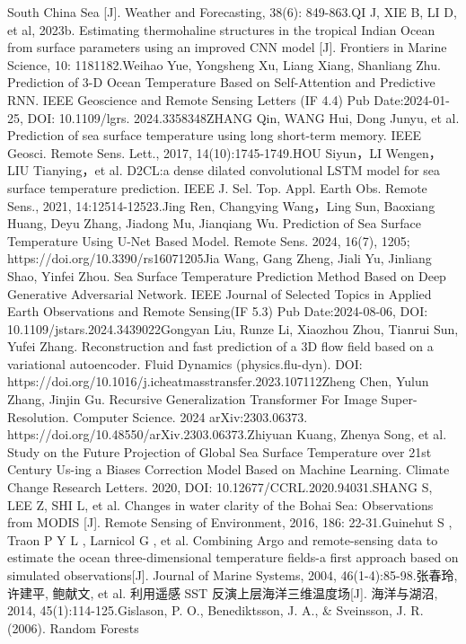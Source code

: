 \documentclass[
  12pt,
]{article}
\begin{document}
South China Sea {[}J{]}. Weather and Forecasting, 38(6): 849-863.QI J,
XIE B, LI D, et al, 2023b. Estimating thermohaline structures in the
tropical Indian Ocean from surface parameters using an improved CNN
model {[}J{]}. Frontiers in Marine Science, 10: 1181182.Weihao Yue,
Yongsheng Xu, Liang Xiang, Shanliang Zhu. Prediction of 3-D Ocean
Temperature Based on Self-Attention and Predictive RNN. IEEE Geoscience
and Remote Sensing Letters (IF 4.4) Pub Date:2024-01-25, DOI:
10.1109/lgrs. 2024.3358348ZHANG Qin, WANG Hui, Dong Junyu, et al.
Prediction of sea surface temperature using long short-term memory. IEEE
Geosci. Remote Sens. Lett., 2017, 14(10):1745-1749.HOU Siyun，LI
Wengen，LIU Tianying，et al. D2CL:a dense dilated convolutional LSTM
model for sea surface temperature prediction. IEEE J. Sel. Top. Appl.
Earth Obs. Remote Sens., 2021, 14:12514-12523.Jing Ren, Changying
Wang，Ling Sun, Baoxiang Huang, Deyu Zhang, Jiadong Mu, Jianqiang Wu.
Prediction of Sea Surface Temperature Using U-Net Based Model. Remote
Sens. 2024, 16(7), 1205; https://doi.org/10.3390/rs16071205Jia Wang,
Gang Zheng, Jiali Yu, Jinliang Shao, Yinfei Zhou. Sea Surface
Temperature Prediction Method Based on Deep Generative Adversarial
Network. IEEE Journal of Selected Topics in Applied Earth Observations
and Remote Sensing(IF 5.3) Pub Date:2024-08-06, DOI:
10.1109/jstars.2024.3439022Gongyan Liu, Runze Li, Xiaozhou Zhou, Tianrui
Sun, Yufei Zhang. Reconstruction and fast prediction of a 3D flow field
based on a variational autoencoder. Fluid Dynamics (physics.flu-dyn).
DOI: https://doi.org/10.1016/j.icheatmasstransfer.2023.107112Zheng Chen,
Yulun Zhang, Jinjin Gu. Recursive Generalization Transformer For Image
Super-Resolution. Computer Science. 2024 arXiv:2303.06373.
https://doi.org/10.48550/arXiv.2303.06373.Zhiyuan Kuang, Zhenya Song, et
al. Study on the Future Projection of Global Sea Surface Temperature
over 21st Century Us-ing a Biases Correction Model Based on Machine
Learning. Climate Change Research Letters. 2020, DOI:
10.12677/CCRL.2020.94031.SHANG S, LEE Z, SHI L, et al. Changes in water
clarity of the Bohai Sea: Observations from MODIS {[}J{]}. Remote
Sensing of Environment, 2016, 186: 22-31.Guinehut S , Traon P Y L ,
Larnicol G , et al. Combining Argo and remote-sensing data to estimate
the ocean three-dimensional temperature fields-a first approach based on
simulated observations{[}J{]}. Journal of Marine Systems, 2004,
46(1-4):85-98.张春玲, 许建平, 鲍献文, et al. 利用遥感 SST
反演上层海洋三维温度场{[}J{]}. 海洋与湖沼, 2014, 45(1):114-125.Gislason,
P. O., Benediktsson, J. A., \& Sveinsson, J. R. (2006). Random Forests
\end{document}
